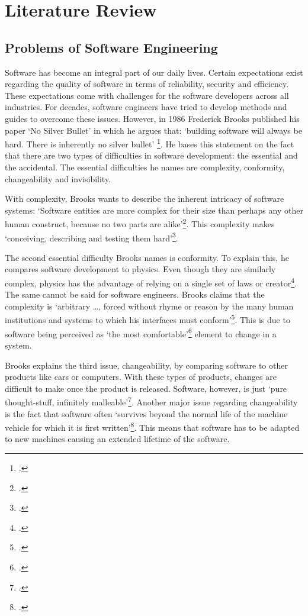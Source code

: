 \section{Literature Review}
\subsection{Problems of Software Engineering}
Software has become an integral part of our daily lives. Certain expectations exist regarding the quality of software in terms of reliability, security and efficiency. These expectations come with challenges for the software developers across all industries.
For decades, software engineers have tried to develop methods and guides to overcome these issues. However, in 1986 Frederick Brooks published his paper `No Silver Bullet'
in which he argues that: `building software will always be hard. There is inherently no silver bullet' \footcite[3]{brooksNoSilverBullet1987}. He bases this statement on the fact that there are two types of difficulties in software development: the essential and the accidental.
The essential difficulties he names are complexity, conformity, changeability and invisibility.

With complexity, Brooks wants to describe the inherent intricacy of software systems: `Software entities are more complex for their size than perhaps any other human construct, because no two parts are alike'\footcite[3]{brooksNoSilverBullet1987}.
This complexity makes `conceiving, describing and testing them hard'\footcite[3]{brooksNoSilverBullet1987}.

The second essential difficulty Brooks names is conformity. To explain this, he compares software development to physics. Even though they are similarly complex, physics has the advantage of relying on a single set of laws or creator\footcite[4]{brooksNoSilverBullet1987}. The same cannot be said for software engineers. Brooks claims that
the complexity is `arbitrary \ldots, forced without rhyme or reason by the many human institutions and systems to which his interfaces must conform'\footcite[4]{brooksNoSilverBullet1987}. This is due to software being perceived as `the most comfortable'\footcite[4]{brooksNoSilverBullet1987} element to change in a system.

Brooks explains the third issue, changeability, by comparing software to other products like cars or computers. With these types of products, changes are difficult to make once the product is released. Software, however, is just `pure thought-stuff, infinitely malleable'\footcite[4]{brooksNoSilverBullet1987}. Another major issue regarding changeability is
the fact that software often `survives beyond the normal life of the machine vehicle for which it is first written'\footcite[4]{brooksNoSilverBullet1987}. This means that software has to be adapted to new machines causing an extended lifetime of the software.

